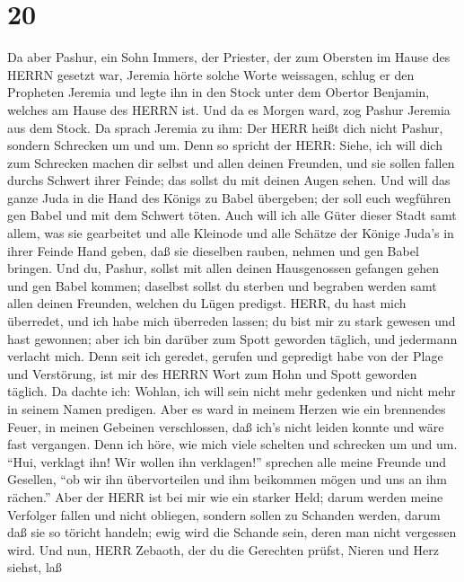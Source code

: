 \hypertarget{section-19}{%
\section{20}\label{section-19}}

 Da aber Pashur, ein Sohn Immers, der Priester, der zum
Obersten im Hause des HERRN gesetzt war, Jeremia hörte solche Worte
weissagen,  schlug er den Propheten Jeremia und legte ihn in
den Stock unter dem Obertor Benjamin, welches am Hause des HERRN ist.
 Und da es Morgen ward, zog Pashur Jeremia aus dem Stock. Da
sprach Jeremia zu ihm: Der HERR heißt dich nicht Pashur, sondern
Schrecken um und um.  Denn so spricht der HERR: Siehe, ich
will dich zum Schrecken machen dir selbst und allen deinen Freunden, und
sie sollen fallen durchs Schwert ihrer Feinde; das sollst du mit deinen
Augen sehen. Und will das ganze Juda in die Hand des Königs zu Babel
übergeben; der soll euch wegführen gen Babel und mit dem Schwert töten.
 Auch will ich alle Güter dieser Stadt samt allem, was sie
gearbeitet und alle Kleinode und alle Schätze der Könige Juda's in ihrer
Feinde Hand geben, daß sie dieselben rauben, nehmen und gen Babel
bringen.  Und du, Pashur, sollst mit allen deinen
Hausgenossen gefangen gehen und gen Babel kommen; daselbst sollst du
sterben und begraben werden samt allen deinen Freunden, welchen du Lügen
predigst.  HERR, du hast mich überredet, und ich habe mich
überreden lassen; du bist mir zu stark gewesen und hast gewonnen; aber
ich bin darüber zum Spott geworden täglich, und jedermann verlacht mich.
 Denn seit ich geredet, gerufen und gepredigt habe von der
Plage und Verstörung, ist mir des HERRN Wort zum Hohn und Spott geworden
täglich.  Da dachte ich: Wohlan, ich will sein nicht mehr
gedenken und nicht mehr in seinem Namen predigen. Aber es ward in meinem
Herzen wie ein brennendes Feuer, in meinen Gebeinen verschlossen, daß
ich's nicht leiden konnte und wäre fast vergangen.  Denn
ich höre, wie mich viele schelten und schrecken um und um. ``Hui,
verklagt ihn! Wir wollen ihn verklagen!'' sprechen alle meine Freunde
und Gesellen, ``ob wir ihn übervorteilen und ihm beikommen mögen und uns
an ihm rächen.''  Aber der HERR ist bei mir wie ein starker
Held; darum werden meine Verfolger fallen und nicht obliegen, sondern
sollen zu Schanden werden, darum daß sie so töricht handeln; ewig wird
die Schande sein, deren man nicht vergessen wird.  Und nun,
HERR Zebaoth, der du die Gerechten prüfst, Nieren und Herz siehst, laß

